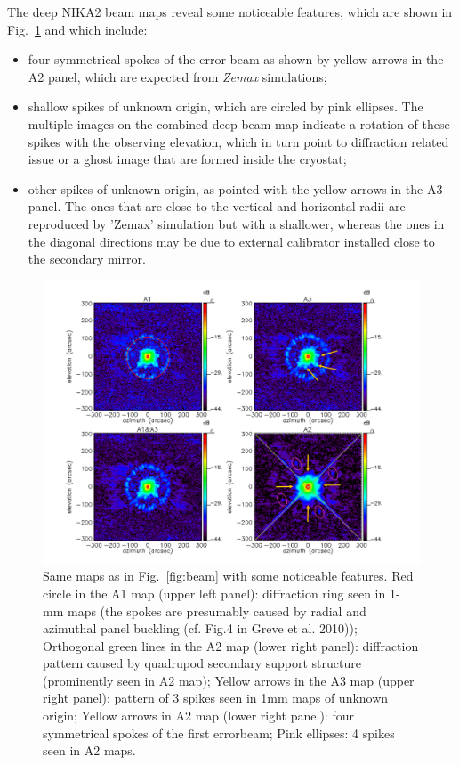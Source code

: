 The deep NIKA2 beam maps reveal some noticeable features, which are
shown in Fig.~\ref{fig:features} and which include:
\begin{itemize}
\item[(1)] four symmetrical spokes of the error beam as shown by
  yellow arrows in the A2 panel, which are expected from \emph{Zemax}
  simulations;
\item[(2)] shallow spikes of unknown origin, which are circled by pink
  ellipses. The multiple images on the combined deep beam map indicate
  a rotation of these spikes with the observing elevation, which in
  turn point to diffraction related issue or a ghost image that are
  formed inside the cryostat;
\item[(3)] other spikes of unknown origin, as pointed with the yellow
  arrows in the A3 panel. The ones that are close to the vertical and
  horizontal radii are reproduced by 'Zemax' simulation but with a  
  shallower, whereas the ones in the diagonal directions may be due to
  external calibrator installed close to the secondary mirror.  
\end{itemize}

\begin{figure}[ht!]
\begin{center}
  \includegraphics[clip, angle=0, scale=0.4]{Figures/Beams_features.pdf}
\caption[Noticeable features of NIKA2 beam pattern.]{ Same maps as in
  Fig.~\ref{fig:beam} with some noticeable features. Red circle in the
  A1 map (upper left panel): diffraction ring seen in 1-mm maps (the spokes are presumably
  caused by radial and azimuthal panel buckling (cf. Fig.4 in Greve et
  al. 2010)); Orthogonal green lines in the A2 map (lower right panel): diffraction
  pattern caused by quadrupod secondary support structure (prominently
  seen in A2 map); Yellow arrows in the A3 map (upper right panel):
  pattern of 3 spikes seen in 1mm maps of unknown origin; Yellow
  arrows in A2 map (lower right panel): four symmetrical spokes of the
  first errorbeam; Pink ellipses: 4 spikes seen in A2 maps.}
\label{fig:features}
\end{center}
\end{figure}


